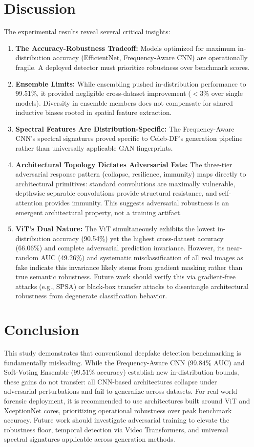 \documentclass[runningheads]{llncs}
\begin{document}
\section{Discussion}
The experimental results reveal several critical insights:
\begin{enumerate}
    \item \textbf{The Accuracy-Robustness Tradeoff:} Models optimized for maximum in-distribution accuracy (EfficientNet, Frequency-Aware CNN) are operationally fragile. A deployed detector must prioritize robustness over benchmark scores.
    \item \textbf{Ensemble Limits:} While ensembling pushed in-distribution performance to 99.51\%, it provided negligible cross-dataset improvement ($<$3\% over single models). Diversity in ensemble members does not compensate for shared inductive biases rooted in spatial feature extraction.
    \item \textbf{Spectral Features Are Distribution-Specific:} The Frequency-Aware CNN's spectral signatures proved specific to Celeb-DF's generation pipeline rather than universally applicable GAN fingerprints.
    \item \textbf{Architectural Topology Dictates Adversarial Fate:} The three-tier adversarial response pattern (collapse, resilience, immunity) maps directly to architectural primitives: standard convolutions are maximally vulnerable, depthwise separable convolutions provide structural resistance, and self-attention provides immunity. This suggests adversarial robustness is an emergent architectural property, not a training artifact.
    \item \textbf{ViT's Dual Nature:} The ViT simultaneously exhibits the lowest in-distribution accuracy (90.54\%) yet the highest cross-dataset accuracy (66.06\%) and complete adversarial prediction invariance. However, its near-random AUC (49.26\%) and systematic misclassification of all real images as fake indicate this invariance likely stems from gradient masking rather than true semantic robustness. Future work should verify this via gradient-free attacks (e.g., SPSA) or black-box transfer attacks to disentangle architectural robustness from degenerate classification behavior.
\end{enumerate}

\section{Conclusion}
This study demonstrates that conventional deepfake detection benchmarking is fundamentally misleading. While the Frequency-Aware CNN (99.84\% AUC) and Soft-Voting Ensemble (99.51\% accuracy) establish new in-distribution bounds, these gains do not transfer: all CNN-based architectures collapse under adversarial perturbations and fail to generalize across datasets. For real-world forensic deployment, it is recommended to use architectures built around ViT and XceptionNet cores, prioritizing operational robustness over peak benchmark accuracy. Future work should investigate adversarial training to elevate the robustness floor, temporal detection via Video Transformers, and universal spectral signatures applicable across generation methods.
\end{document}
